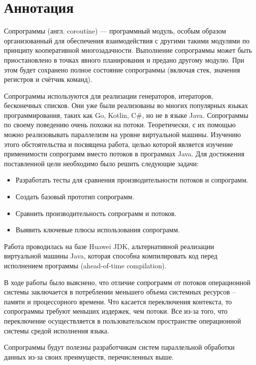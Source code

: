 \section{Аннотация}

Сопрограммы (англ. coroutine) — программный модуль, особым образом организованный для
обеспечения взаимодействия с другими такими модулями по принципу кооперативной
многозадачности\cite{coroutine}. Выполнение сопрограммы может быть
приостановлено в точках явного планирования и предано другому модулю. 
При этом будет сохранено полное состояние сопрограммы (включая стек, значения регистров и счётчик команд). 

\par
Сопрограммы используются для реализации генераторов, итераторов, бесконечных списков. 
Они уже были реализованы во многих популярных языках программирования, таких как Go, Kotlin,
C\#, но не в языке Java. Сопрограммы по своему поведению очень похожи на потоки.
Теоретически, с их помощью можно реализовывать параллелизм на уровне виртуальной машины.
Изучению этого обстоятельства и посвящена работа, целью которой является изучение
применимости сопрограмм вместо потоков в программах Java.
Для достижения поставленной цели необходимо было решить следующие задачи:
\begin{itemize}
	\item Разработать тесты для сравнения производительности потоков и сопрограмм.
	\item Создать базовый прототип сопрограмм.
	\item Сравнить производительность сопрограмм и потоков.
	\item Выявить ключевые плюсы использования сопрограмм.
\end{itemize}
Работа проводилась на базе Huawei JDK, альтернативной реализации виртуальной машины Java, которая способна компилировать код перед исполнением программы (ahead-of-time compilation). 
\par
В ходе работы было выяснено, что отличие сопрограмм от потоков операционной системы
заключается в потреблении меньшего объема системных ресурсов – памяти и процессорного времени.
Что касается переключения контекста, то сопрограммы требуют меньших издержек, чем
потоки. Все из-за того, что переключение осуществляется в пользовательском пространстве
операционной системы средой исполнения языка. 
\par
Сопрограммы будут полезны разработчикам систем параллельной обработки данных из-за своих преимуществ, перечисленных выше.
\clearpage

